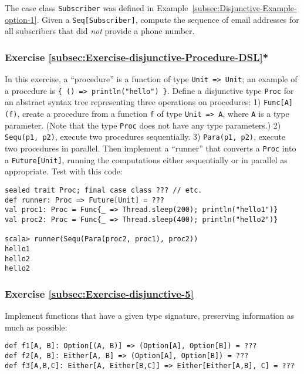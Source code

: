 The case class \lstinline!Subscriber! was defined in Example~\ref{subsec:Disjunctive-Example-option-1}.
Given a \lstinline!Seq[Subscriber]!, compute the sequence of email
addresses for all subscribers that did \emph{not} provide a phone
number.

\subsubsection{Exercise \label{subsec:Exercise-disjunctive-Procedure-DSL}\ref{subsec:Exercise-disjunctive-Procedure-DSL}{*}}

In this exercise, a ``procedure'' is a function
of type \lstinline!Unit => Unit!; an example of a procedure is \lstinline!{ () => println("hello") }!.
Define a disjunctive type \lstinline!Proc! for an abstract syntax
tree representing three operations on procedures: 1) \lstinline!Func[A](f)!,
create a procedure from a function \lstinline!f! of type \lstinline!Unit => A!,
where \lstinline!A! is a type parameter. (Note that the type \lstinline!Proc!
does not have any type parameters.) 2) \lstinline!Sequ(p1, p2)!,
execute two procedures sequentially. 3) \lstinline!Para(p1, p2)!,
execute two procedures in parallel. Then implement a ``runner''
that converts a \lstinline!Proc! into a \lstinline!Future[Unit]!,
running the computations either sequentially or in parallel as appropriate.
Test with this code:
\begin{lstlisting}
sealed trait Proc; final case class ??? // etc.
def runner: Proc => Future[Unit] = ???
val proc1: Proc = Func{_ => Thread.sleep(200); println("hello1")}
val proc2: Proc = Func{_ => Thread.sleep(400); println("hello2")}

scala> runner(Sequ(Para(proc2, proc1), proc2))
hello1
hello2
hello2
\end{lstlisting}


\subsubsection{Exercise \label{subsec:Exercise-disjunctive-5}\ref{subsec:Exercise-disjunctive-5}}

Implement functions that have a given type signature, preserving information
as much as possible: 
\begin{lstlisting}
def f1[A, B]: Option[(A, B)] => (Option[A], Option[B]) = ???
def f2[A, B]: Either[A, B] => (Option[A], Option[B]) = ???
def f3[A,B,C]: Either[A, Either[B,C]] => Either[Either[A,B], C] = ???
\end{lstlisting}


